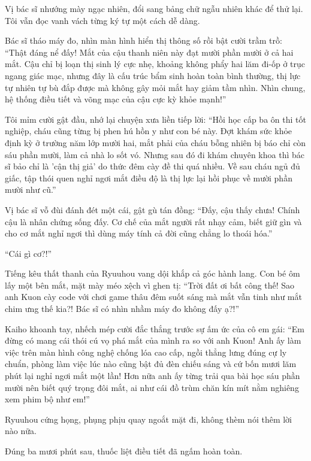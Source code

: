 ﻿\documentclass[../main.tex]{subfiles}
\begin{document}
Vị bác sĩ nhướng mày ngạc nhiên, đổi sang bảng chữ ngẫu nhiên khác để thử lại. Tôi vẫn đọc vanh vách từng ký tự một cách dễ dàng.

Bác sĩ tháo máy đo, nhìn màn hình hiển thị thông số rồi bật cười trầm trồ: ``Thật đáng nể đấy! Mắt của cậu thanh niên này đạt mười phần mười ở cả hai mắt. Cậu chỉ bị loạn thị sinh lý cực nhẹ, khoảng không phẩy hai lăm đi-ốp ở trục ngang giác mạc, nhưng đây là cấu trúc bẩm sinh hoàn toàn bình thường, thị lực tự nhiên tự bù đắp được mà không gây mỏi mắt hay giảm tầm nhìn. Nhìn chung, hệ thống điều tiết và võng mạc của cậu cực kỳ khỏe mạnh!''

Tôi mỉm cười gật đầu, nhớ lại chuyện xưa liền tiếp lời: ``Hồi học cấp ba ôn thi tốt nghiệp, cháu cũng từng bị phen hú hồn y như con bé này. Đợt khám sức khỏe định kỳ ở trường năm lớp mười hai, mắt phải của cháu bỗng nhiên bị báo chỉ còn sáu phần mười, làm cả nhà lo sốt vó. Nhưng sau đó đi khám chuyên khoa thì bác sĩ bảo chỉ là 'cận thị giả' do thức đêm cày đề thi quá nhiều. Về sau cháu ngủ đủ giấc, tập thói quen nghỉ ngơi mắt điều độ là thị lực lại hồi phục về mười phần mười như cũ.''

Vị bác sĩ vỗ đùi đánh đét một cái, gật gù tán đồng: ``Đấy, cậu thấy chưa! Chính cậu là nhân chứng sống đấy. Cơ chế của mắt người rất nhạy cảm, biết giữ gìn và cho cơ mắt nghỉ ngơi thì dùng máy tính cả đời cũng chẳng lo thoái hóa.''

``Cái gì cơ?!''

Tiếng kêu thất thanh của Ryuuhou vang dội khắp cả góc hành lang. Con bé ôm lấy một bên mắt, mặt mày méo xệch vì ghen tị: ``Trời đất ơi bất công thế! Sao anh Kuon cày code với chơi game thâu đêm suốt sáng mà mắt vẫn tinh như mắt chim ưng thế kia?! Bác sĩ có nhìn nhầm máy đo không đấy ạ?!''

Kaiho khoanh tay, nhếch mép cười đắc thắng trước sự ấm ức của cô em gái: ``Em đừng có mang cái thói cú vọ phá mắt của mình ra so với anh Kuon! Anh ấy làm việc trên màn hình công nghệ chống lóa cao cấp, ngồi thẳng lưng đúng cự ly chuẩn, phòng làm việc lúc nào cũng bật đủ đèn chiếu sáng và cứ bốn mươi lăm phút lại nghỉ ngơi mắt một lần! Hơn nữa anh ấy từng trải qua bài học sáu phần mười nên biết quý trọng đôi mắt, ai như cái đồ trùm chăn kín mít nằm nghiêng xem phim bộ như em!''

Ryuuhou cứng họng, phụng phịu quay ngoắt mặt đi, không thèm nói thêm lời nào nữa.

\ct

Đúng ba mươi phút sau, thuốc liệt điều tiết đã ngấm hoàn toàn.
\end{document}
